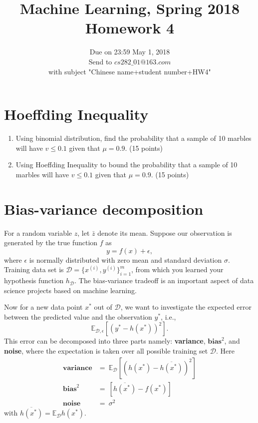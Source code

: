 \documentclass{article}
\begin{document}
\title{Machine Learning, Spring 2018\\Homework 4}
\date{Due on 23:59 May 1, 2018\\Send to $cs282\_01@163.com$ \\with subject "Chinese name+student number+HW4"}
\maketitle




\section{Hoeffding Inequality}

\begin{enumerate}[(1)]
\item Using binomial distribution, find the probability that a sample of 10 marbles will have $v \leq 0.1$ given that $\mu = 0.9$. (15 points)
\item Using Hoeffding Inequality to bound the probability that a sample of 10 marbles will have $v \leq 0.1$ given that $\mu = 0.9$. (15 points)
\end{enumerate}



\section{Bias-variance decomposition}
\label{problem1}
For a random variable $z$, let $\bar z$ denote its mean. Suppose our observation is generated by the true function $f$ as
$$
y = f(x) +\epsilon,
$$
where $\epsilon$ is normally distributed with zero mean and standard deviation $\sigma$. Training data set is $\mathcal{D}=\{x^{(i)},y^{(i)}\}_{i=1}^m$, from which you learned your hypothesis function $h_{\mathcal{D}}$. The bias-variance tradeoff is an important aspect of data science projects based on machine learning. 

Now for a new data point $x^*$ out of $\mathcal{D}$, we want to investigate the expected error between the predicted value and the observation $y^*$, i.e.,
$$
\mathbb{E}_{\mathcal{D},\epsilon}[(y^*-h(x^*))^2].
$$
This error can be decomposed into three parts namely: \textbf{variance}, $\textbf{bias}^2$, and \textbf{noise}, where the expectation is taken over all possible training set $\mathcal{D}$. Here
$$\begin{aligned} 
\textbf{variance} &=\ \mathbb{E}_{\mathcal{D}}[(h(x^*)-\overline{h(x^*)})^2]\\
\textbf{bias}^2 &=\ [\overline{h(x^*)}-f(x^*)]\\
\textbf{noise} &=\ \sigma^2
\end{aligned}
$$
with $\overline{h(x^*)}=\mathbb{E}_{\mathcal{D}}h(x^*)$.
 
\end{document}
